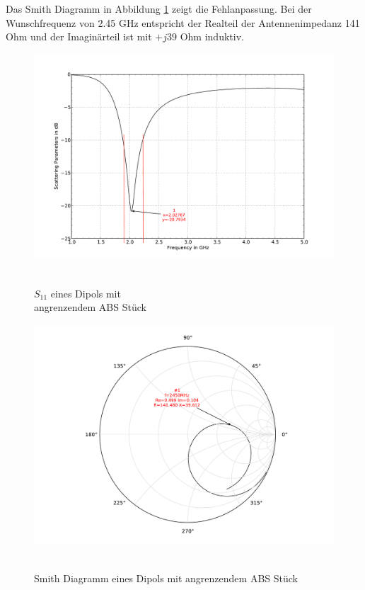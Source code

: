 Das Smith Diagramm in Abbildung \ref{fig:Smith_Dipol_ABS_4} zeigt die Fehlanpassung. Bei der Wunschfrequenz von 2.45 GHz entspricht der Realteil der Antennenimpedanz 141 Ohm und der Imaginärteil ist mit $+j39$ Ohm induktiv.
\begin{figure}[!ht]
\begin{center}
  \includegraphics[width=\linewidth]{content/bilder/Evaluation/Dipol/S11DipolABS.pdf}
  \caption{\\$S_{11}$ eines Dipols mit \\angrenzendem ABS Stück}\label{fig:S11_Dipol_ABS_3}
\endminipage%
{}
  \includegraphics[width=\linewidth]{content/bilder/Evaluation/Dipol/SmithDipolABS.pdf}
  \caption{\\Smith Diagramm eines Dipols mit angrenzendem ABS Stück}\label{fig:Smith_Dipol_ABS_4}
\endminipage
\end{center}
\end{figure}

